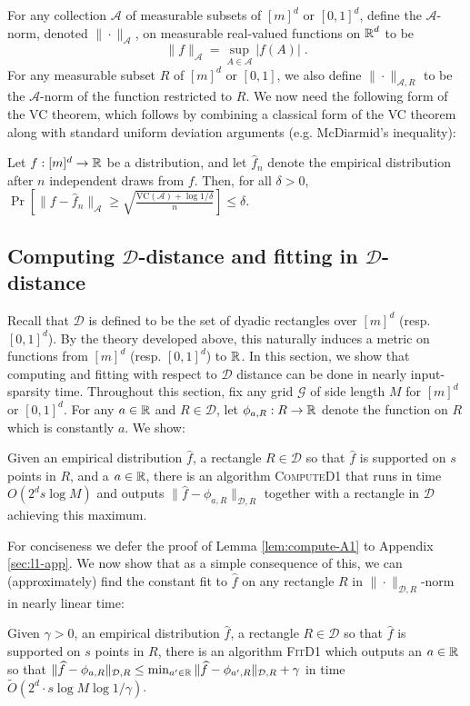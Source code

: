 \documentclass[final,12pt]{colt2018} %
\newcommand{\Otilde}{\widetilde{O}}
\newcommand{\hier}{\mathcal{D}}
\newcommand{\calG}{\mathcal{G}}
\newcommand{\fhat}{\widehat{f}}
\newcommand{\VC}{\mathrm{VC}}
\newcommand{\A}{\mathcal{A}}
\begin{document}
\noindent
For any collection $\mathcal{A}$ of measurable subsets of $[m]^d$ or $[0, 1]^d$, 
define the $\mathcal{A}$-norm, denoted $\| \cdot \|_\mathcal{A}$, on measurable real-valued functions on $\operatorname{\mathbb{R}}^d$ to be
$$\| f \|_\A = \sup_{A \in \A} |f(A)| \;.$$
For any measurable subset $R$ of $[m]^d$ or $[0, 1]$, 
we also define $\| \cdot \|_{\mathcal{A}, R}$ to be the $\A$-norm of the function restricted to $R$.
We now need the following form of the VC theorem, which follows by combining a classical form of the VC theorem along with standard uniform deviation arguments (e.g. McDiarmid's inequality): 
\begin{theorem}
\label{thm:vc}
Let $f: [m]^d \to \operatorname{\mathbb{R}}$ be a distribution, and let $\fhat_n$ denote the empirical distribution after $n$ independent draws from $f$.
Then, for all $\delta > 0$,
$
\Pr \left[ \| f - \fhat_n \|_\A \geq \sqrt{\frac{\VC(\A) + \log 1 / \delta}{n}} \right] \leq \delta
$.
\end{theorem}
\subsection{Computing $\hier$-distance and fitting in $\hier$-distance}
Recall that $\hier$ is defined to be the set of dyadic rectangles over $[m]^d$ (resp. $[0, 1]^d$).
By the theory developed above, this naturally induces a metric on functions from $[m]^d$ (resp. $[0, 1]^d$) to $\operatorname{\mathbb{R}}$.
In this section, we show that computing and fitting with respect to $\hier$ distance can be done in nearly input-sparsity time.
Throughout this section, fix any grid $\calG$ of side length $M$ for $[m]^d$ or $[0, 1]^d$.
For any $a \in \operatorname{\mathbb{R}}$ and $R \in \hier$, let $\phi_{a, R}: R \to \operatorname{\mathbb{R}}$ denote the function on $R$ which is constantly $a$.
We show:

\begin{lemma}
\label{lem:compute-A1}
Given an empirical distribution $\fhat$, a rectangle $R \in \mathcal{D}$ so that $\fhat$ 
is supported on $s$ points in $R$, and a $a \in \operatorname{\mathbb{R}}$, there is an algorithm \textsc{ComputeD1} 
that runs in time $O(2^d s \log M)$ and outputs $\| \fhat - \phi_{a, R} \|_{\hier, R}$ 
 together with a rectangle in $\hier$ achieving this maximum.
\end{lemma}
\noindent
For conciseness we defer the proof of Lemma \ref{lem:compute-A1} to Appendix \ref{sec:l1-app}.
We now show that as a simple consequence of this, we can (approximately) 
find the constant fit to $\fhat$ on any rectangle $R$ in $\| \cdot \|_{\hier, R}$-norm in nearly linear time:
\begin{corollary}
Given $\gamma > 0$, an empirical distribution $\fhat$, a rectangle $R \in \mathcal{D}$ 
so that $\fhat$ is supported on $s$ points in $R$, there is an algorithm \textsc{FitD1} which outputs an $a \in \operatorname{\mathbb{R}}$ so that 
$
\| \fhat - \phi_{a, R} \|_{\hier, R} \leq \min_{a' \in \R} \| \fhat - \phi_{a', R} \|_{\hier, R} + \gamma
$
in time $\Otilde(2^d \cdot s \log M \log 1 / \gamma)$.
\end{corollary}
\end{document}
